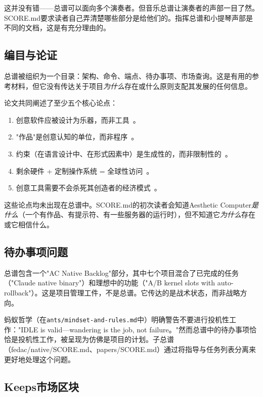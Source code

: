 \documentclass[10pt,letterpaper,twocolumn]{article}
\begin{document}
这并没有错——总谱可以面向多个演奏者。但音乐总谱让演奏者的声部一目了然。SCORE.md要求读者自己弄清楚哪些部分是给他们的。指挥总谱和小提琴声部是不同的文档，这是有充分理由的。

\subsection{编目与论证}

总谱被组织为一个目录：架构、命令、端点、待办事项、市场查询。这是有用的参考材料，但它没有传达关于项目\emph{为什么}存在或什么原则支配其发展的任何信息。

论文共同阐述了至少五个核心论点：
\begin{enumerate}
\item 创意软件应被设计为乐器，而非工具~\citep{scudder2026goodiepal}。
\item "作品"是创意认知的单位，而非程序~\citep{scudder2026pieces}。
\item 约束（在语言设计中、在形式因素中）是生成性的，而非限制性的~\citep{scudder2026kidlisp, scudder2026cards}。
\item 剩余硬件 + 定制操作系统 = 全球性访问~\citep{scudder2026os, scudder2026plork}。
\item 创意工具需要不会杀死其创造者的经济模式~\citep{scudder2026sustainability}。
\end{enumerate}

这些论点均未出现在总谱中。SCORE.md的初次读者会知道Aesthetic Computer\emph{是什么}（一个有作品、有提示符、有一些服务器的运行时），但不知道它\emph{为什么}存在或它相信什么。

\subsection{待办事项问题}

总谱包含一个"AC Native Backlog"部分，其中七个项目混合了已完成的任务（"Claude native binary"）和理想中的功能（"A/B kernel slots with auto-rollback"）。这是项目管理工件，不是总谱。它传达的是战术状态，而非战略方向。

蚂蚁哲学（在\texttt{ants/mindset-and-rules.md}中）明确警告不要进行投机性工作："IDLE is valid---wandering is the job, not failure。"然而总谱中的待办事项恰恰是投机性工作，被呈现为仿佛是项目的计划。子总谱（fedac/native/SCORE.md、papers/SCORE.md）通过将指导与任务列表分离来更好地处理这个问题。

\subsection{Keeps市场区块}
\end{document}
